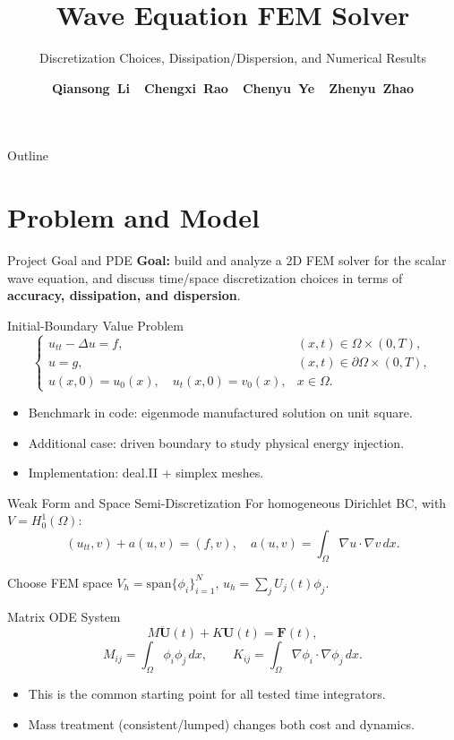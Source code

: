 \documentclass{beamer}
\title{Wave Equation FEM Solver}
\subtitle{Discretization Choices, Dissipation/Dispersion, and Numerical Results}
\author{\textbf{Qiansong\ Li\ \ Chengxi\ Rao\ \ Chenyu\ Ye\ \ Zhenyu\ Zhao}}
\begin{document}
\begin{frame}
  \maketitle
\end{frame}

\begin{frame}{Outline}
  \tableofcontents
\end{frame}

\section{Problem and Model}

\begin{frame}{Project Goal and PDE}
  \textbf{Goal:} build and analyze a 2D FEM solver for the scalar wave equation,
  and discuss time/space discretization choices in terms of
  \textbf{accuracy, dissipation, and dispersion}.

  \begin{block}{Initial-Boundary Value Problem}
    \[
      \begin{cases}
        u_{tt} - \Delta u = f, & (x,t)\in\Omega\times(0,T),\\
        u = g, & (x,t)\in\partial\Omega\times(0,T),\\
        u(x,0)=u_0(x),\quad u_t(x,0)=v_0(x), & x\in\Omega.
      \end{cases}
    \]
  \end{block}

  \begin{itemize}
    \item Benchmark in code: eigenmode manufactured solution on unit square.
    \item Additional case: driven boundary to study physical energy injection.
    \item Implementation: deal.II + simplex meshes.
  \end{itemize}
\end{frame}

\begin{frame}{Weak Form and Space Semi-Discretization}
  For homogeneous Dirichlet BC, with $V=H_0^1(\Omega)$:
  \[
    (u_{tt},v) + a(u,v) = (f,v), \quad
    a(u,v)=\int_\Omega \nabla u\cdot\nabla v\,dx.
  \]

  Choose FEM space $V_h=\text{span}\{\phi_i\}_{i=1}^N$, $u_h=\sum_j U_j(t)\phi_j$.

  \begin{block}{Matrix ODE System}
    \[
      M\ddot{\mathbf U}(t) + K\mathbf U(t) = \mathbf F(t),
    \]
    \[
      M_{ij}=\int_\Omega \phi_i\phi_j\,dx,\qquad
      K_{ij}=\int_\Omega \nabla\phi_i\cdot\nabla\phi_j\,dx.
    \]
  \end{block}

  \begin{itemize}
    \item This is the common starting point for all tested time integrators.
    \item Mass treatment (consistent/lumped) changes both cost and dynamics.
  \end{itemize}
\end{frame}
\end{document}
